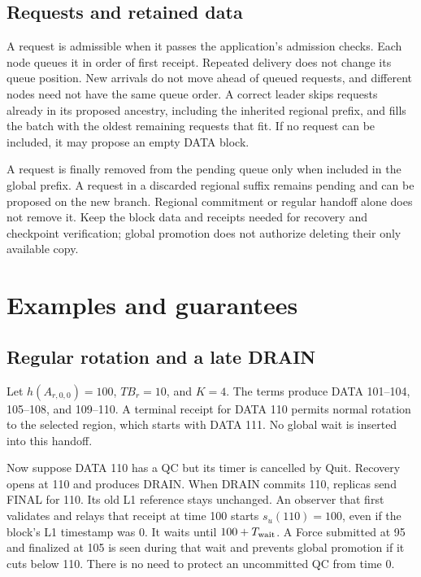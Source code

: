 \documentclass[11pt,a4paper]{article}
\newif\ifrevmarks
\newcommand{\Rv}[1]{\ifrevmarks\leavevmode{\color{rvBlue}#1}\else#1\fi}
\newcommand{\Cid}[1]{\ifrevmarks\textsuperscript{\hyperlink{chg:#1}{\color{rvBlue}\sffamily\scriptsize#1}}\fi}
\newcommand{\Twait}{T_{\rm wait}}
\newcommand{\TB}{\mathit{TB}}
\begin{document}
\subsection{Requests and retained data}
\label{sec:requests}
A request is admissible when it passes the application's admission
checks. Each node queues it in order of first receipt. Repeated delivery
does not change its queue position. \Rv{New arrivals do not move
ahead of queued requests, and different nodes need not have the same
queue order.} A correct leader skips requests
already in its proposed ancestry, including the inherited regional
prefix, and fills the batch with the oldest remaining requests that fit.
\Rv{If no request can be included, it may propose an empty DATA block.}

A request is finally removed from the pending queue only when included
in the global prefix. A request in a discarded regional suffix remains
pending and can be proposed on the new branch. Regional commitment or
regular handoff alone does not remove it. Keep the block data and
receipts needed for recovery and checkpoint verification; global
promotion does not authorize deleting their only available copy.

\section{Examples and guarantees}
\label{sec:examples}

\subsection{Regular rotation and a late DRAIN}
Let $h(A_{r,0,0})=100$, $\TB_r=10$, and $K=4$. The terms produce
DATA 101--104, 105--108, and 109--110. A terminal receipt for DATA 110
permits normal rotation to the selected region, which starts with DATA
111. No global wait is inserted into this handoff.

Now suppose DATA 110 has a QC but its timer is cancelled by Quit.
Recovery opens at 110 and produces DRAIN. When DRAIN commits 110,
replicas send FINAL for 110. Its old L1 reference stays unchanged.
An observer that first validates and relays that receipt at time 100
starts $s_u(110)=100$, even if the block's L1 timestamp was 0. It waits
until $100+\Rv{\Twait}$. A Force submitted at 95 and finalized at 105 is seen
during that wait and prevents global promotion if it cuts below 110.
There is no need to protect an uncommitted QC from time 0.
\end{document}
